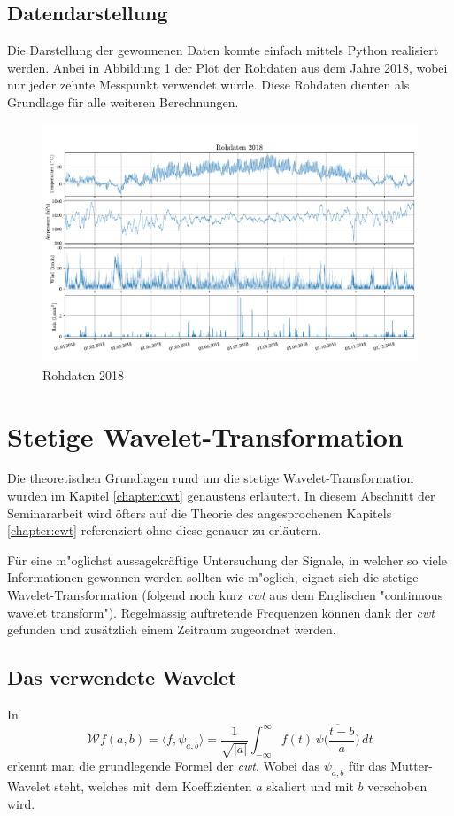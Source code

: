 \begin{refsection}
\subsection{Datendarstellung}
Die Darstellung der gewonnenen Daten konnte einfach mittels Python realisiert werden.
Anbei in Abbildung \ref{fig:rawdata} der Plot der Rohdaten aus dem Jahre 2018, wobei nur jeder zehnte Messpunkt verwendet wurde.
Diese Rohdaten dienten als Grundlage für alle weiteren Berechnungen. 
\begin{figure}
	\centering
	\includegraphics[width=1\textwidth]{papers/wwt/images/raw.pdf}
	\caption{Rohdaten 2018}
	\label{fig:rawdata}
\end{figure}


\section{Stetige Wavelet-Transformation}
Die theoretischen Grundlagen rund um die stetige Wavelet-Transformation wurden im Kapitel \ref{chapter:cwt} genaustens erläutert. 
In diesem Abschnitt der Seminararbeit wird öfters auf die Theorie des angesprochenen Kapitels \ref{chapter:cwt} referenziert ohne diese genauer zu erläutern. 

Für eine m"oglichst aussagekräftige Untersuchung der Signale, in welcher so viele Informationen gewonnen werden sollten wie m"oglich, eignet sich die stetige Wavelet-Transformation (folgend noch kurz \textit{cwt} aus dem Englischen "continuous wavelet transform"). 
Regelmässig auftretende Frequenzen können dank der \textit{cwt} gefunden und zusätzlich einem Zeitraum zugeordnet werden.
\subsection{Das verwendete Wavelet}
In
\begin{equation}
\mathcal{W}f (a,b)
=
\langle f,\psi_{a,b}\rangle
=
\frac{1}{\sqrt{|a|}}\int_{-\infty}^\infty f(t)\,\overline{
	\psi\biggl(\frac{t-b}{a}\biggr)}\,dt
\label{eq:cwt1}
\end{equation}
erkennt man die grundlegende Formel der \textit{cwt}.
Wobei das $\psi_{a,b}$ für das Mutter-Wavelet steht, welches mit dem Koeffizienten $a$ skaliert und mit $b$ verschoben wird.


\end{refsection}
